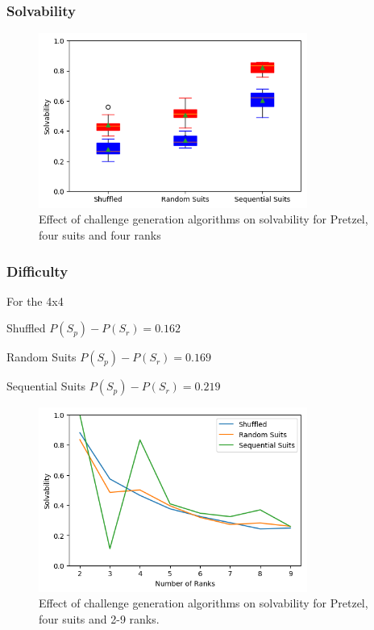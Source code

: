 \documentclass[journal]{IEEEtran}
\begin{document}

\subsubsection{Solvability}

\begin{figure}[t]
\includegraphics[width=8.8cm]{pretzelsolve4x4.png}
\caption{Effect of challenge generation algorithms on solvability for Pretzel, four suits and four ranks}
\label{fig:pretzel44solved}
\end{figure}

\subsubsection{Difficulty}
For the 4x4

Shuffled $P(S_p) - P(S_r) = 0.162$

Random Suits $P(S_p) - P(S_r) = 0.169$

Sequential Suits $P(S_p) - P(S_r) = 0.219$


\begin{figure}[t]
\includegraphics[width=8.8cm]{pretzelfulln.png}
\caption{Effect of challenge generation algorithms on solvability for Pretzel, four suits and 2-9 ranks.}
\label{fig:pretzelfullsolve}
\end{figure}
\end{document}
